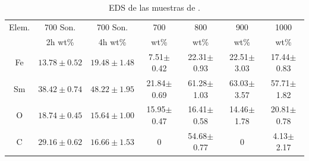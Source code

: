 \documentclass[../main.tex]{subfiles}
\begin{document}
        \begin{table}[H]
            \centering
        \begin{tabular}{|c||c|c|c|c|c|c|}
        \hline
        Elem. &700\gradoC{} Son.&700\gradoC{} Son.&700\gradoC{}&800\gradoC{}&900\gradoC{}&1000\gradoC{}\\
        &2h wt\%&4h wt\%&wt\%&wt\%&wt\%&wt\%\\
        \hline\hline
        Fe &$13.78\pm0.52$&$19.48\pm1.48$& 7.51$\pm$0.42 & 22.31$\pm$0.93 & 22.51$\pm$3.03 & 17.44$\pm$0.83 \\
        Sm &$38.42\pm0.74$&$48.22\pm1.95$& 21.84$\pm$0.69 & 61.28$\pm$1.03 & 63.03$\pm$3.57 & 57.71$\pm$1.82 \\
        O &$18.74\pm0.45$&$15.64\pm1.00$& 15.95$\pm$0.47 & 16.41$\pm$0.58 & 14.46$\pm$1.78 & 20.81$\pm$0.78 \\
        C &$29.16\pm0.62$&$16.66\pm1.53$& 0 & 54.68$\pm$0.77 & 0 & 4.13$\pm$2.17 \\ 
        \hline
        \end{tabular} 
            \caption{EDS de las muestras de \sama{}.}
            \label{tab:EDSSm}
\end{table}
\end{document}
